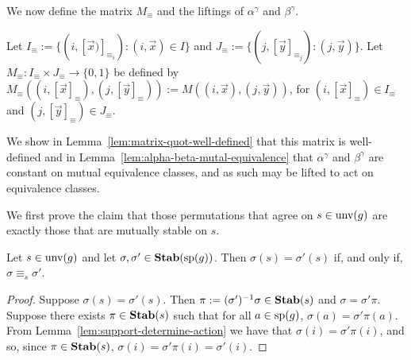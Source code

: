 \documentclass[../paper.tex]{subfiles}
\begin{document}

We now define the matrix $M_{\equiv}$ and the liftings of $\alpha^{\gamma}$ and
$\beta^{\gamma}$.

Let $I_{\equiv} := \{(i, [\vec{x})]_{\equiv_i}) : (i, \vec{x}) \in I\}$ and
$J_\equiv := \{(j, [\vec{y}]_{\equiv_j}) : (j, \vec{y})\}$. Let $M_{\equiv} :
I_{\equiv} \times J_{\equiv} \rightarrow \{0,1\}$ be defined by $M_\equiv ((i,
[\vec{x}]_\equiv), (j, [\vec{y}]_\equiv)) := M((i,\vec{x}), (j, \vec{y}))$, for
$(i, [\vec{x}]_{\equiv}) \in I_\equiv$ and $(j, [\vec{y}]_{\equiv}) \in
J_\equiv$.

We show in Lemma~\ref{lem:matrix-quot-well-defined} that this matrix is
well-defined and in Lemma~\ref{lem:alpha-beta-mutal-equivalence} that
$\alpha^{\gamma}$ and $\beta^{\gamma}$ are constant on mutual equivalence
classes, and as such may be lifted to act on equivalence classes.

We first prove the claim that those permutations that agree on $s \in
\text{unv}(g)$ are exactly those that are mutually stable on $s$.

\begin{lem}
	Let $s \in \text{unv}(g)$ and let $\sigma, \sigma' \in \text{\textbf{Stab}}(\text{sp}(g))$. Then
  $\sigma(s) = \sigma' (s)$ if, and only if, $\sigma \equiv_s \sigma'$.
	\label{lem:functions-mutual-equivalence}
\end{lem}
\begin{proof}
	Suppose $\sigma(s) = \sigma'(s)$. Then $\pi := (\sigma')^{-1}\sigma \in
  \text{\textbf{Stab}}(s)$ and $\sigma = \sigma' \pi$. Suppose there exists $\pi \in \text{\textbf{Stab}}(s)$
  such that for all $a \in \text{sp}(g)$, $\sigma (a) = \sigma' \pi (a)$. From
  Lemma~\ref{lem:support-determine-action} we have that $\sigma (i) = \sigma'
  \pi (i)$, and so, since $\pi \in \text{\textbf{Stab}}(s)$, $\sigma(i) = \sigma' \pi (i) =
  \sigma' (i)$.
\end{proof}

\end{document}
